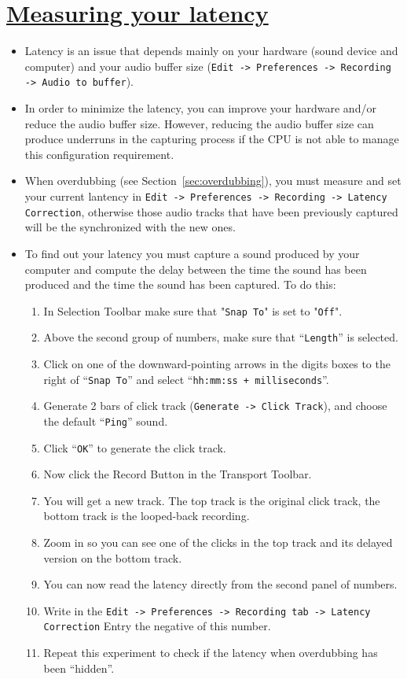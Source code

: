 \section{\href{http://manual.audacityteam.org/o/man/latency_test.html}{Measuring your latency}}
\begin{itemize}
\item Latency is an issue that depends mainly on your hardware (sound
  device and computer) and your audio buffer size %
  (\verb|Edit -> Preferences -> Recording -> Audio to buffer|).
\item In order to minimize the latency, you can improve your hardware
  and/or reduce the audio buffer size. However, reducing the audio
  buffer size can produce underruns in the capturing process if the
  CPU is not able to manage this configuration requirement.
\item When overdubbing (see Section~\ref{sec:overdubbing}), you must
  measure and set your current lantency in %
  \verb|Edit -> Preferences -> Recording -> Latency Correction|,
  otherwise those audio tracks that have been previously captured will
  be the synchronized with the new ones.
\item To find out your latency you must capture a sound produced by
  your computer and compute the delay between the time the sound has
  been produced and the time the sound has been captured. To do this:
  \begin{enumerate}
  \item In Selection Toolbar make sure that "\verb|Snap To|" is set to
    "\verb|Off|".
  \item Above the second group of numbers, make sure that
    ``\verb|Length|'' is selected.
  \item Click on one of the downward-pointing arrows in the digits
    boxes to the right of ``\verb|Snap To|'' and select
    ``\verb|hh:mm:ss + milliseconds|''.
  \item Generate 2 bars of click track %
    (\verb|Generate -> Click Track|), and choose the default
    ``\verb|Ping|'' sound.
  \item Click ``\verb|OK|'' to generate the click track.
  \item Now click the Record Button in the Transport Toolbar.
  \item You will get a new track. The top track is the original click
    track, the bottom track is the looped-back recording.
  \item Zoom in so you can see one of the clicks in the top track and
    its delayed version on the bottom track.
  \item You can now read the latency directly from the second panel of
    numbers.
  \item Write in the
    \verb|Edit -> Preferences -> Recording tab -> Latency Correction|
    Entry the negative of this number.
  \item Repeat this experiment to check if the latency when
    overdubbing has been ``hidden''.
  \end{enumerate}
\end{itemize}

